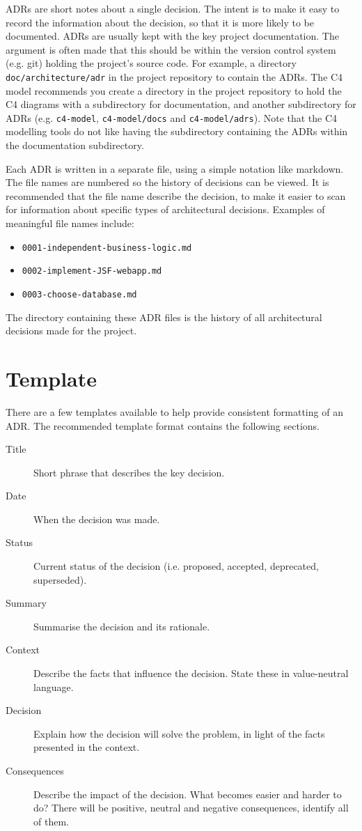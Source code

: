 ADRs are short notes about a single decision.
The intent is to make it easy to record the information about the decision, so that it is more likely to be documented.
ADRs are usually kept with the key project documentation.
The argument is often made that this should be within the version control system (e.g. git) holding the project's source code.
For example, a directory \texttt{doc/architecture/adr} in the project repository to contain the ADRs.
The C4 model recommends you create a directory in the project repository to hold the C4 diagrams
with a subdirectory for documentation, and another subdirectory for ADRs
(e.g. \texttt{c4-model}, \texttt{c4-model/docs} and \texttt{c4-model/adrs}).
Note that the C4 modelling tools do not like having the subdirectory containing the ADRs within the documentation subdirectory.

Each ADR is written in a separate file, using a simple notation like markdown.
The file names are numbered so the history of decisions can be viewed.
It is recommended that the file name describe the decision,
to make it easier to scan for information about specific types of architectural decisions.
Examples of meaningful file names include:
\begin{itemize}[noitemsep,nolistsep]
    \item \texttt{0001-independent-business-logic.md}
    \item \texttt{0002-implement-JSF-webapp.md}
    \item \texttt{0003-choose-database.md}
\end{itemize}
The directory containing these ADR files is the history of all architectural decisions made for the project.

\section{Template}
There are a few templates available to help provide consistent formatting of an ADR.
The recommended template format contains the following sections.
\begin{description}
    \item[Title] Short phrase that describes the key decision.
    \item[Date] When the decision was made.
    \item[Status] Current status of the decision (i.e. proposed, accepted, deprecated, superseded).
    \item[Summary] Summarise the decision and its rationale.
    \item[Context] Describe the facts that influence the decision. State these in value-neutral language.
    \item[Decision] Explain how the decision will solve the problem, in light of the facts presented in the context.
    \item[Consequences] Describe the impact of the decision. What becomes easier and harder to do?
                                       There will be positive, neutral and negative consequences, identify all of them.
\end{description}

